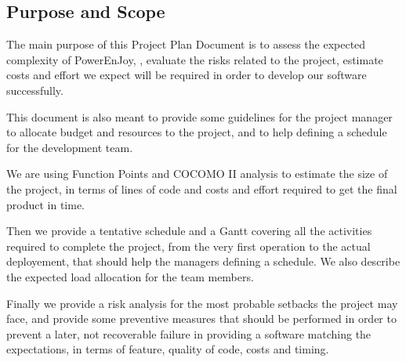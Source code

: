 \documentclass[11pt]{article} %
\newcommand{\pecomma}{PowerEnJoy, }
\begin{document}
\subsection{Purpose and Scope}

The main purpose of this Project Plan Document is to assess the expected complexity of \pecomma, evaluate the risks related to the project, estimate costs and effort we expect will be required in order to develop our software successfully.

This document is also meant to provide some guidelines for the project manager to allocate budget and resources to the project, and to help defining a schedule for the development team.

We are using Function Points and COCOMO II analysis to estimate the size of the project, in terms of lines of code and costs and effort required to get the final product in time. 

Then we provide a tentative schedule and a Gantt covering all the activities required to complete the project, from the very first operation to the actual deployement, that should help the managers defining a schedule. We also describe the expected load allocation for the team members.

Finally we provide a risk analysis for the most probable setbacks the project may face, and provide some preventive measures that should be performed in order to prevent a later, not recoverable failure in providing a software matching the expectations, in terms of feature, quality of code, costs and timing.
\end{document}
